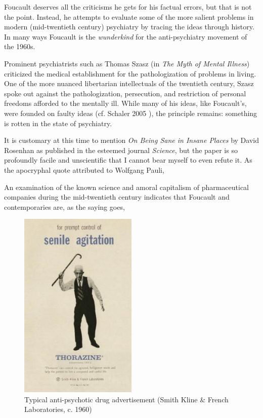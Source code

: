 \documentclass[]{article}
\begin{document}
		Foucault deserves all the criticisms he gets for his factual errors, but that is not the point. Instead, he attempts to evaluate some of the more salient problems in modern (mid-twentieth century) psychiatry by tracing the ideas through history. In many ways Foucault is the \textit{wunderkind} for the anti-psychiatry movement of the 1960s. 
		
		Prominent psychiatrists such as Thomas Szasz (in \textit{The Myth of Mental Illness}) criticized the medical establishment for the  pathologization of problems in living. One of the more nuanced libertarian intellectuals of the twentieth century, Szasz spoke out against the pathologization, persecution, and restriction of personal freedoms afforded to the mentally ill. While many of his ideas, like Foucault's, were founded on faulty ideas (cf. Schaler 2005 ), the principle remains: something is rotten in the state of psychiatry.
		
		It is customary at this time to mention \textit{On Being Sane in Insane Places} by David Rosenhan as published in the esteemed journal \textit{Science}, but the paper is so profoundly facile and unscientific that I cannot bear myself to even refute it. As the apocryphal quote attributed to Wolfgang Pauli, 
		
		An examination of the known science and amoral capitalism of pharmaceutical companies during the mid-twentieth century indicates that Foucault and contemporaries are, as the saying goes, 
		
		\begin{figure}
			\centering
			\includegraphics[width=0.5\textwidth]{graphics/ThorazineAdvertisement1}
			\caption{Typical anti-psychotic drug advertisement (Smith Kline \& French Laboratories, c. 1960)}
		\end{figure}
		
\end{document}
